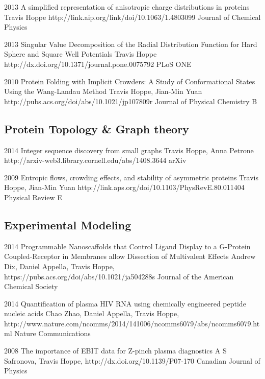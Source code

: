 \documentclass[]{scrartcl}
\begin{document}
\begin{cleanCV}
\Paper
{2013}
{A simplified representation of anisotropic charge distributions in proteins}
{Travis Hoppe}
{http://link.aip.org/link/doi/10.1063/1.4803099}
{Journal of Chemical Physics}

\Paper
{2013}
{Singular Value Decomposition of the Radial Distribution Function 
for Hard Sphere and Square Well Potentials}
{Travis Hoppe}
{http://dx.doi.org/10.1371/journal.pone.0075792}
{PLoS ONE}


\Paper
{2010}
{Protein Folding with Implicit Crowders: 
  A Study of Conformational States Using the Wang-Landau Method}
{Travis Hoppe, Jian-Min Yuan}
{http://pubs.acs.org/doi/abs/10.1021/jp107809r}
{Journal of Physical Chemistry B}


\subsection{Protein Topology \& Graph theory}

\Paper
{2014}
{Integer sequence discovery from small graphs}
{Travis Hoppe, Anna Petrone}
{http://arxiv-web3.library.cornell.edu/abs/1408.3644}
{arXiv}

\Paper
{2009}
{Entropic flows, crowding effects, and stability of asymmetric proteins}
{Travis Hoppe, Jian-Min Yuan}
{http://link.aps.org/doi/10.1103/PhysRevE.80.011404}
{Physical Review E}

\pagebreak

\subsection{Experimental Modeling}

\Paper
{2014}
{Programmable Nanoscaffolds that Control Ligand Display to a G-Protein Coupled-Receptor in Membranes allow Dissection of Multivalent Effects}
{Andrew Dix, Daniel Appella, Travis Hoppe, \etal}
{https://pubs.acs.org/doi/abs/10.1021/ja504288s}
{Journal of the American Chemical Society}

\Paper
{2014}
{Quantification of plasma HIV RNA using chemically engineered peptide nucleic acids}
{Chao Zhao, Daniel Appella, Travis Hoppe, \etal}
{http://www.nature.com/ncomms/2014/141006/ncomms6079/abs/ncomms6079.html}
{Nature Communications}

\Paper
{2008}
{The importance of EBIT data for Z-pinch plasma diagnostics}
{A S Safronova, Travis Hoppe, \etal}
{http://dx.doi.org/10.1139/P07-170}
{Canadian Journal of Physics}


\end{cleanCV}
\end{document}
